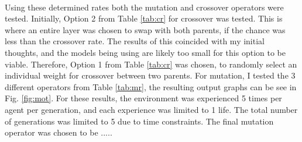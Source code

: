 \paragraph{}


Using these determined rates both the mutation and crossover operators were tested. Initially, Option 2 from Table \ref{tab:cr} for crossover was tested. This is where an entire layer was chosen to swap with both parents, if the chance was less than the crossover rate. The results of this coincided with my initial thoughts, and the models being using are likely too small for this option to be viable. Therefore, Option 1 from Table \ref{tab:cr} was chosen, to randomly select an individual weight for crossover between two parents. For mutation, I tested the 3 different operators from Table \ref{tab:mr}, the resulting output graphs can be see in Fig. \ref{fig:mot}. For these results, the environment was experienced 5 times per agent per generation, and each experience was limited to 1 life. The total number of generations was limited to 5 due to time constraints. The final mutation operator was chosen to be .....

